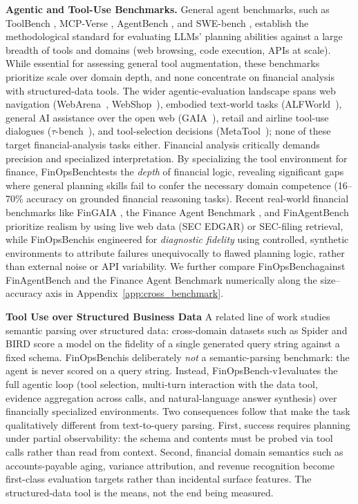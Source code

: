 \documentclass[11pt]{article}
\newcommand{\datasetname}{FinOpsBench}\xspace
\newcommand{\synthsubset}{FinOpsBench-v1}\xspace
\begin{document}
\noindent \textbf{Agentic and Tool-Use Benchmarks.}
General agent benchmarks, such as ToolBench \citep{qin2024tool, qin2023toolllm}, MCP-Verse \citep{lei2025mcpverse}, AgentBench \citep{liu2023agentbench}, and SWE-bench \citep{jimenez2024swebench}, establish the methodological
standard for evaluating LLMs'
planning abilities against a large breadth of tools and domains (web browsing, code execution, APIs at scale). While essential for assessing general tool augmentation, these
benchmarks prioritize scale over domain depth, and none concentrate on financial analysis with structured-data tools. The wider agentic-evaluation landscape spans web navigation (WebArena~\citep{zhou2024webarena}, WebShop~\citep{yao2022webshop}), embodied text-world tasks (ALFWorld~\citep{shridhar2021alfworld}), general AI assistance over the open web (GAIA~\citep{mialon2024gaia}), retail and airline tool-use dialogues ($\tau$-bench~\citep{yao2024taubench}), and tool-selection decisions (MetaTool~\citep{huang2024metatool}); none of these target financial-analysis tasks either. Financial analysis critically demands precision and specialized interpretation. By
specializing the tool environment for finance, \datasetname tests the \textit{depth} of financial logic, revealing significant gaps
where general planning skills fail to confer the necessary domain competence (16--70\% accuracy on grounded financial reasoning tasks). Recent real-world financial benchmarks like FinGAIA \citep{zeng2025fingaiachinesebenchmarkai},
the Finance Agent Benchmark \citep{bigeard2025financeagentbenchmarkbenchmarking}, and FinAgentBench \citep{choi2025finagentbench} prioritize realism by using live web data (SEC
EDGAR) or SEC-filing retrieval, while \datasetname is engineered for \emph{diagnostic fidelity} using controlled, synthetic environments to attribute failures
unequivocally to flawed planning logic, rather than external noise or API variability. We further compare \datasetname against FinAgentBench and the Finance Agent Benchmark numerically along the size--accuracy axis in Appendix~\ref{app:cross_benchmark}.

\noindent \textbf{Tool Use over Structured Business Data}
A related line of work studies semantic parsing over structured data: cross-domain datasets such as Spider \citep{spider} and BIRD
\citep{li2024can} score a model on the fidelity of a single generated query string against a fixed schema. \datasetname is
deliberately \emph{not} a semantic-parsing benchmark: the agent is never scored on a query string. Instead, \synthsubset evaluates
the full agentic loop (tool selection, multi-turn interaction with the data tool, evidence aggregation across calls, and natural-language
answer synthesis) over financially specialized environments. Two consequences follow that make the task qualitatively different from
text-to-query parsing. First, success requires planning under partial observability: the schema and contents must be probed via tool calls
rather than read from context. Second, financial domain semantics such as accounts-payable aging, variance attribution, and revenue
recognition become first-class evaluation targets rather than incidental surface features. The structured-data tool is the means, not
the end being measured.
\end{document}
